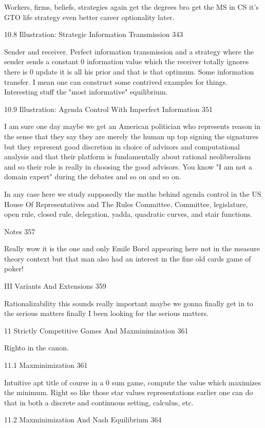 Workers, firms, beliefs, strategies again get the degrees bro get the MS in CS it's GTO life strategy even better career optionality later.

10.8 Illustration: Strategic Information Transmission 343

Sender and receiver. Perfect information transmission and a strategy where the sender sends a constant $0$ information value which the receiver totally ignores there is $0$ update it is all his prior and that is that optimum. Some information transfer. I mean one can construct some contrived examples for things. Interesting stuff the "most informative" equilibrium.

10.9 Illustration: Agenda Control With Imperfect Information 351

I am sure one day maybe we get an American politician who represents reason in the sense that they say they are merely the human up top signing the signatures but they represent good discretion in choice of advisors and computational analysis and that their platform is fundamentally about rational neoliberalism and so their role is really in choosing the good advisors. You know "I am not a domain expert" during the debates and so on and so on.

In any case here we study supposedly the maths behind agenda control in the US House Of Representatives and The Rules Committee. Committee, legislature, open rule, closed rule, delegation, yadda, quadratic curves, and stair functions.

Notes 357

Really wow it is the one and only Emile Borel appearing here not in the measure theory context but that man also had an interest in the fine old cards game of poker!

III Variants And Extensions 359

Rationalizability this sounds really important maybe we gonna finally get in to the serious matters finally I been looking for the serious matters.

11 Strictly Competitive Games And Maxminimization 361

Righto in the canon.

11.1 Maxminimization 361

Intuitive apt title of course in a $0$ sum game, compute the value which maximizes the minimum. Right so like those star values representations earlier one can do that in both a discrete and continuous setting, calculus, etc.

11.2 Maxminimization And Nash Equilibrium 364

